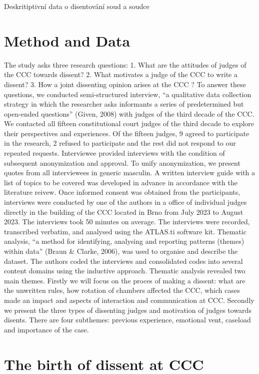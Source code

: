 \documentclass[
  11pt,
]{article}
\begin{document}
Deskritiptivní data o disentování soud a soudce

\hypertarget{method-and-data}{%
\section{Method and Data}\label{method-and-data}}

The study asks three research questions: 1. What are the attitudes of
judges of the CCC towards dissent? 2. What motivates a judge of the CCC
to write a dissent? 3. How a joint dissenting opinion arises at the CCC
? To answer these questions, we conducted semi-structured interview, ``a
qualitative data collection strategy in which the researcher asks
informants a series of predetermined but open-ended questions'' (Given,
2008) with judges of the third decade of the CCC. We contacted all
fifteen constitutional court judges of the third decade to explore their
perspectives and experiences. Of the fifteen judges, 9 agreed to
participate in the research, 2 refused to participate and the rest did
not respond to our repeated requests. Interviewee provided interviews
with the condition of subsequent anonymization and approval. To unify
anonymization, we present quotes from all interviewees in generic
masculin. A written interview guide with a list of topics to be covered
was developed in advance in accordance with the literature reivew. Once
informed consent was obtained from the participants, interviews were
conducted by one of the authors in a office of individual judges
directly in the building of the CCC located in Brno from July 2023 to
August 2023. The interviews took 50 minutes on average. The interviews
were recorded, transcribed verbatim, and analysed using the ATLAS.ti
software kit. Thematic analysis, ``a method for identifying, analysing
and reporting patterns (themes) within data'' (Braun \& Clarke, 2006),
was used to organise and describe the dataset. The authors coded the
interviews and consolidated codes into several content domains using the
inductive approach. Thematic analysis revealed two main themes. Firstly
we will focus on the proces of making a dissent: what are the unwritten
rules, how rotation of chambers affected the CCC, which cases made an
impact and aspects of interaction and communication at CCC. Secondly we
present the three types of dissenting judges and motivation of judges
towards disents. There are four subthemes: previous experience,
emotional vent, caseload and importance of the case.

\hypertarget{the-birth-of-dissent-at-ccc}{%
\section{The birth of dissent at
CCC}\label{the-birth-of-dissent-at-ccc}}
\end{document}
